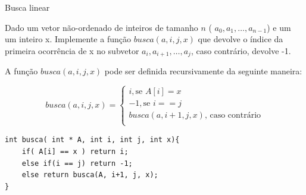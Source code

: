 \begin{exemplo}{Busca linear}

Dado um vetor não-ordenado de inteiros de tamanho $n$ ( $a_0,a_1, \ldots, a_{n-1}$) e um um inteiro x. Implemente a função $busca(a, i, j, x)$ que devolve o índice da primeira ocorrência de x no subvetor $a_i, a_{i+1}, \ldots, a_j$, caso contrário, devolve -1. 

A função $busca(a, i, j, x)$ pode ser definida recursivamente da seguinte maneira:

\begin{equation}
busca(a, i, j , x) = 
\begin{cases}
  i, \text{se } A[i] = x\\
 -1, \text{se } i == j \\
busca(a, i+1, j, x) \text{, caso contrário}\\

\end{cases}
\end{equation}

\begin{verbatim}
int busca( int * A, int i, int j, int x){
    if( A[i] == x ) return i;
    else if(i == j) return -1;
    else return busca(A, i+1, j, x);
}
\end{verbatim}


\end{exemplo}

